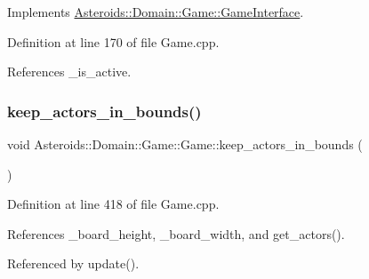 Implements \hyperlink{classAsteroids_1_1Domain_1_1Game_1_1GameInterface_ad7519687f2a916cef85be8a68c6ce6a4}{Asteroids\+::\+Domain\+::\+Game\+::\+Game\+Interface}.



Definition at line 170 of file Game.\+cpp.



References \+\_\+is\+\_\+active.

\mbox{\label{classAsteroids_1_1Domain_1_1Game_1_1Game_a594494581cf464eafb2842cb98387819}} 
\subsubsection{\texorpdfstring{keep\+\_\+actors\+\_\+in\+\_\+bounds()}{keep\_actors\_in\_bounds()}}
{\footnotesize\ttfamily void Asteroids\+::\+Domain\+::\+Game\+::\+Game\+::keep\+\_\+actors\+\_\+in\+\_\+bounds (\begin{DoxyParamCaption}{ }\end{DoxyParamCaption})\hspace{0.3cm}{\ttfamily [private]}}



Definition at line 418 of file Game.\+cpp.



References \+\_\+board\+\_\+height, \+\_\+board\+\_\+width, and get\+\_\+actors().



Referenced by update().

